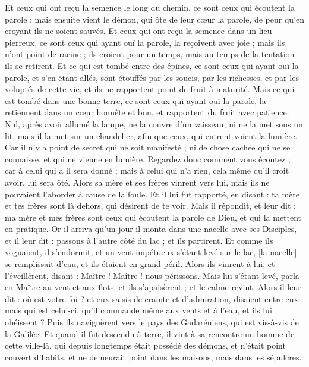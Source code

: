 \begin{multicols}{2}
Et ceux qui ont reçu la semence le long du chemin, ce sont ceux qui écoutent la parole ; mais ensuite vient le démon, qui ôte de leur cœur la parole, de peur qu'en croyant ils ne soient sauvés.
Et ceux qui ont reçu la semence dans un lieu pierreux, ce sont ceux qui ayant ouï la parole, la reçoivent avec joie ; mais ils n'ont point de racine ; ils croient pour un temps, mais au temps de la tentation ils se retirent.
Et ce qui est tombé entre des épines, ce sont ceux qui ayant ouï la parole, et s'en étant allés, sont étouffés par les soucis, par les richesses, et par les voluptés de cette vie, et ils ne rapportent point de fruit à maturité.
Mais ce qui est tombé dans une bonne terre, ce sont ceux qui ayant ouï la parole, la retiennent dans un cœur honnête et bon, et rapportent du fruit avec patience.
Nul, après avoir allumé la lampe, ne la couvre d'un vaisseau, ni ne la met sous un lit, mais il la met sur un chandelier, afin que ceux, qui entrent voient la lumière.
Car il n'y a point de secret qui ne soit manifesté ; ni de chose cachée qui ne se connaisse, et qui ne vienne en lumière.
Regardez donc comment vous écoutez ; car à celui qui a il sera donné ; mais à celui qui n'a rien, cela même qu'il croit avoir, lui sera ôté.
Alors sa mère et ses frères vinrent vers lui, mais ils ne pouvaient l'aborder à cause de la foule.
Et il lui fut rapporté, en disant : ta mère et tes frères sont là dehors, qui désirent de te voir.
Mais il répondit, et leur dit : ma mère et mes frères sont ceux qui écoutent la parole de Dieu, et qui la mettent en pratique.
Or il arriva qu'un jour il monta dans une nacelle avec ses Disciples, et il leur dit : passons à l'autre côté du lac ; et ils partirent.
Et comme ils voguaient, il s'endormit, et un vent impétueux s'étant levé sur le lac, [la nacelle] se remplissait d'eau, et ils étaient en grand péril.
Alors ils vinrent à lui, et l'éveillèrent, disant : Maître ! Maître ! nous périssons. Mais lui s'étant levé, parla en Maître au vent et aux flots, et ils s'apaisèrent ; et le calme revint.
Alors il leur dit : où est votre foi ? et eux saisis de crainte et d'admiration, disaient entre eux : mais qui est celui-ci, qu'il commande même aux vents et à l'eau, et ils lui obéissent ?
Puis ils naviguèrent vers le pays des Gadaréniens, qui est vis-à-vis de la Galilée.
Et quand il fut descendu à terre, il vint à sa rencontre un homme de cette ville-là, qui depuis longtemps était possédé des démons, et n'était point couvert d'habits, et ne demeurait point dans les maisons, mais dans les sépulcres.

\end{multicols}
